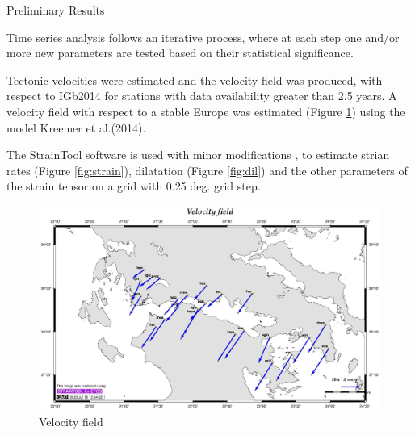 \documentclass[final,a0,portrait]{beamer}
\newlength{\onecolwid}
\begin{document}
\begin{frame}[t]
\begin{columns}[t]
\begin{column}{\onecolwid}

\begin{block}{Preliminary Results}
{\small
Time series analysis follows an iterative process, where at each step one and/or more new parameters are tested based on their statistical significance.

Tectonic velocities were estimated and the velocity field was produced, with respect to IGb2014 for stations with data availability greater than 2.5 years. A velocity field with respect to a stable Europe was estimated (Figure \ref{fig:crvels}) using the model Kreemer et al.(2014)\cite{kreemer14}.

The StrainTool software is used with minor modifications \cite{straintool}, to estimate strian rates (Figure \ref{fig:strain}), dilatation (Figure \ref{fig:dil}) and the other parameters of the strain tensor on a grid with 0.25 deg. grid step.

\begin{figure}
  \centering
  \includegraphics[width=1\onecolwid]{gsg2022_vel.jpg}
  \caption{Velocity field}
  \label{fig:crvels}
\end{figure}

}
\end{block}
\end{column}
\end{columns}
\end{frame}
\end{document}
